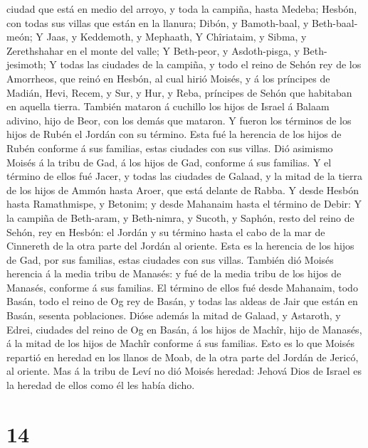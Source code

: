 ciudad que está en medio del arroyo, y toda la campiña, hasta Medeba;
 Hesbón, con todas sus villas que están en la llanura;
Dibón, y Bamoth-baal, y Beth-baal-meón;  Y Jaas, y
Keddemoth, y Mephaath,  Y Chîriataim, y Sibma, y
Zerethshahar en el monte del valle;  Y Beth-peor, y
Asdoth-pisga, y Beth-jesimoth;  Y todas las ciudades de la
campiña, y todo el reino de Sehón rey de los Amorrheos, que reinó en
Hesbón, al cual hirió Moisés, y á los príncipes de Madián, Hevi, Recem,
y Sur, y Hur, y Reba, príncipes de Sehón que habitaban en aquella
tierra.  También mataron á cuchillo los hijos de Israel á
Balaam adivino, hijo de Beor, con los demás que mataron.  Y
fueron los términos de los hijos de Rubén el Jordán con su término. Esta
fué la herencia de los hijos de Rubén conforme á sus familias, estas
ciudades con sus villas.  Dió asimismo Moisés á la tribu de
Gad, á los hijos de Gad, conforme á sus familias.  Y el
término de ellos fué Jacer, y todas las ciudades de Galaad, y la mitad
de la tierra de los hijos de Ammón hasta Aroer, que está delante de
Rabba.  Y desde Hesbón hasta Ramathmispe, y Betonim; y
desde Mahanaim hasta el término de Debir:  Y la campiña de
Beth-aram, y Beth-nimra, y Sucoth, y Saphón, resto del reino de Sehón,
rey en Hesbón: el Jordán y su término hasta el cabo de la mar de
Cinnereth de la otra parte del Jordán al oriente.  Esta es
la herencia de los hijos de Gad, por sus familias, estas ciudades con
sus villas.  También dió Moisés herencia á la media tribu
de Manasés: y fué de la media tribu de los hijos de Manasés, conforme á
sus familias.  El término de ellos fué desde Mahanaim, todo
Basán, todo el reino de Og rey de Basán, y todas las aldeas de Jair que
están en Basán, sesenta poblaciones.  Dióse además la mitad
de Galaad, y Astaroth, y Edrei, ciudades del reino de Og en Basán, á los
hijos de Machîr, hijo de Manasés, á la mitad de los hijos de Machîr
conforme á sus familias.  Esto es lo que Moisés repartió en
heredad en los llanos de Moab, de la otra parte del Jordán de Jericó, al
oriente.  Mas á la tribu de Leví no dió Moisés heredad:
Jehová Dios de Israel es la heredad de ellos como él les había dicho.

\hypertarget{section-13}{%
\section{14}\label{section-13}}

